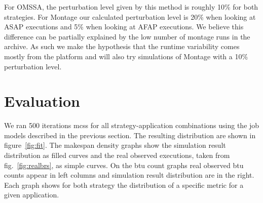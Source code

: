 \documentclass[10pt,conference,compsocconf]{IEEEtran}
\begin{document}

For OMSSA, the perturbation level given by this method is roughly 10\% for both
strategies. For Montage  our calculated perturbation level is  20\% when looking
at ASAP  executions and  5\% when  looking at AFAP  executions. We  believe this
difference can be partially  explained by the low number of  montage runs in the
archive. As such we make the hypothesis that the runtime variability comes
mostly from the platform and will also try simulations of Montage with a 10\%
perturbation level.

\section{Evaluation}
\label{sec:eval}

We ran 500 iterations \acp{mcs} for all strategy-application combinations using
the job models described in the previous section. The resulting distribution are
shown in figure~\ref{fig:fit}. The makespan density graphs show the simulation
result distribution as filled curves and the real observed executions, taken
from fig.~\ref{fig:realbrs}, as simple curves. On the \ac{btu} count graphs real
observed \ac{btu} counts appear in left columns and simulation result
distribution are in the right. Each graph shows for both strategy the
distribution of a specific metric for a given application.
\end{document}
